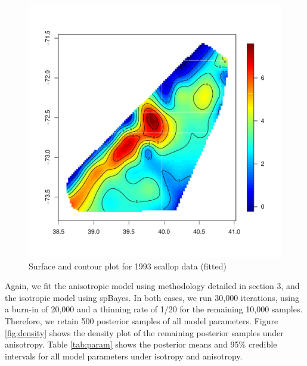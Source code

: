 \documentclass[12pt,twoside]{dukestatscithesis}
\theoremstyle{definition}
\theoremstyle{definition}
\theoremstyle{definition}
\theoremstyle{remark}
\begin{document}
\begin{figure}
\includegraphics[scale=0.7]{figure/surface} \caption{Surface and contour plot for 1993 scallop data (fitted)}\label{fig:surf}
\end{figure}
Again, we fit the anisotropic model using methodology detailed in
section 3, and the isotropic model using spBayes. In both cases, we run
30,000 iterations, using a burn-in of 20,000 and a thinning rate of 1/20
for the remaining 10,000 samples. Therefore, we retain 500 posterior
samples of all model parameters. Figure \ref{fig:density} shows the
density plot of the remaining posterior samples under anisotropy. Table
\ref{tab:param} shows the posterior means and 95\% credible intervals
for all model parameters under isotropy and anisotropy.
\end{document}
